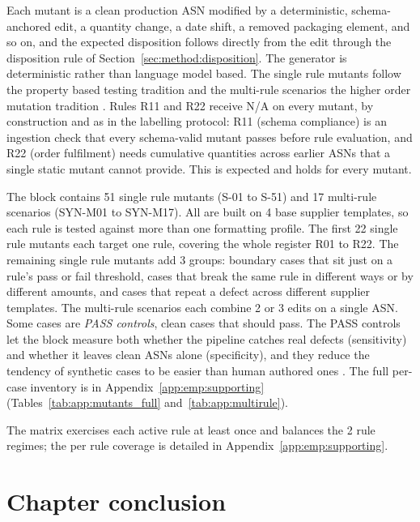 Each mutant is a clean production ASN modified by a deterministic, schema-anchored edit, a quantity change, a date shift, a removed packaging element, and so on, and the expected disposition follows directly from the edit through the disposition rule of Section~\ref{sec:method:disposition}. The generator is deterministic rather than language model based. The single rule mutants follow the property based testing tradition \citep{bartocci2023} and the multi-rule scenarios the higher order mutation tradition \citep{wang2022hom, wu2025hom}. Rules R11 and R22 receive N/A on every mutant, by construction and as in the labelling protocol: R11 (schema compliance) is an ingestion check that every schema-valid mutant passes before rule evaluation, and R22 (order fulfilment) needs cumulative quantities across earlier ASNs that a single static mutant cannot provide. This is expected and holds for every mutant.

The block contains 51 single rule mutants (S-01 to S-51) and 17 multi-rule scenarios (SYN-M01 to SYN-M17). All are built on 4 base supplier templates, so each rule is tested against more than one formatting profile. The first 22 single rule mutants each target one rule, covering the whole register R01 to R22. The remaining single rule mutants add 3 groups: boundary cases that sit just on a rule's pass or fail threshold, cases that break the same rule in different ways or by different amounts, and cases that repeat a defect across different supplier templates. The multi-rule scenarios each combine 2 or 3 edits on a single ASN. Some cases are \emph{PASS controls}, clean cases that should pass. The PASS controls let the block measure both whether the pipeline catches real defects (sensitivity) and whether it leaves clean ASNs alone (specificity), and they reduce the tendency of synthetic cases to be easier than human authored ones \citep{gill2025synthetic}. The full per-case inventory is in Appendix~\ref{app:emp:supporting} (Tables~\ref{tab:app:mutants_full} and~\ref{tab:app:multirule}).


The matrix exercises each active rule at least once and balances the 2 rule regimes; the per rule coverage is detailed in Appendix~\ref{app:emp:supporting}.


\section{Chapter conclusion}
\label{sec:emp:conclusion}

